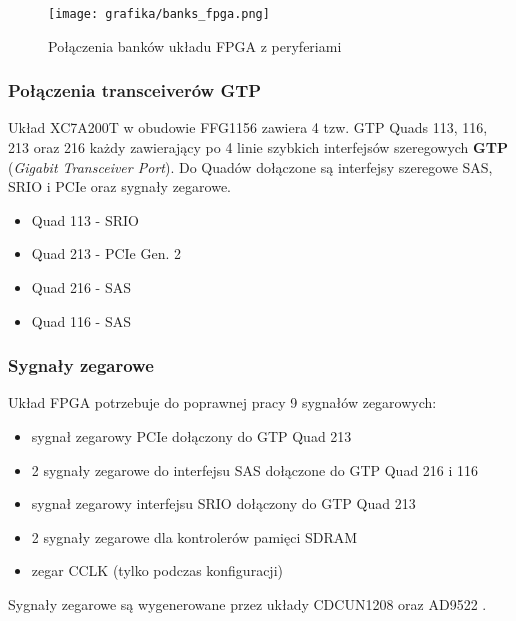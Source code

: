 \begin{figure}[here]
\begin{center}
\texttt{[image: grafika/banks\_fpga.png]}
\end{center}
\caption{Połączenia banków układu FPGA z peryferiami}
\label{FPGA_BANKS_CONN}
\end{figure}
\subsubsection{Połączenia transceiverów GTP}
Układ XC7A200T w obudowie FFG1156 zawiera 4 tzw. GTP Quads \cite{FPGA:GTP} 113, 116, 213 oraz 216 każdy zawierający po 4 linie szybkich interfejsów szeregowych \textbf{GTP} (\textit{Gigabit Transceiver Port}). Do Quadów dołączone są interfejsy szeregowe SAS, SRIO i PCIe oraz sygnały zegarowe. 
\begin{itemize}
\item
Quad 113 - SRIO
\item
Quad 213 - PCIe Gen. 2
\item
Quad 216 - SAS
\item
Quad 116 - SAS

\end{itemize}
\subsubsection{Sygnały zegarowe}
Układ FPGA potrzebuje do poprawnej pracy 9 sygnałów zegarowych:
\begin{itemize}
\item
sygnał zegarowy PCIe dołączony do GTP Quad 213
\item
2 sygnały zegarowe do interfejsu SAS dołączone do GTP Quad 216 i 116
\item
sygnał zegarowy interfejsu SRIO dołączony do GTP Quad 213
\item
2 sygnały zegarowe dla kontrolerów pamięci SDRAM
\item
zegar CCLK (tylko podczas konfiguracji)
\end{itemize}
Sygnały zegarowe są wygenerowane przez układy CDCUN1208 \cite{CDCUN1208} oraz AD9522 \cite{AD9522}.
